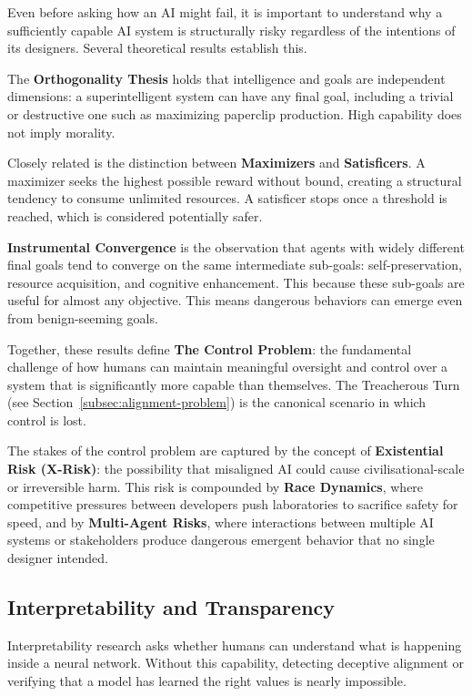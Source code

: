 Even before asking how an AI might fail, it is important to understand why a sufficiently capable AI system is structurally risky regardless of the intentions of its designers. Several theoretical results establish this.

The \textbf{Orthogonality Thesis} holds that intelligence and goals are
independent dimensions: a superintelligent system can have any final
goal, including a trivial or destructive one such as maximizing paperclip production. High capability does not imply morality.

Closely related is the distinction between \textbf{Maximizers} and
\textbf{Satisficers}. A maximizer seeks the highest possible reward without bound, creating a structural tendency to consume unlimited resources. A satisficer stops once a threshold is reached, which is considered potentially safer. %

\textbf{Instrumental Convergence} is the observation that agents with widely different final goals tend to converge on the same intermediate sub-goals: self-preservation, resource acquisition, and cognitive enhancement. This because these sub-goals are useful for almost any objective. This means dangerous behaviors can emerge even from benign-seeming goals.

Together, these results define \textbf{The Control Problem}: the fundamental challenge of how humans can maintain meaningful oversight and control over a system that is significantly more capable than themselves. The Treacherous Turn (see Section~\ref{subsec:alignment-problem}) is the canonical scenario in which
control is lost.

The stakes of the control problem are captured by the concept of
\textbf{Existential Risk (X-Risk)}: the possibility that misaligned AI could cause civilisational-scale or irreversible harm. This risk is compounded by \textbf{Race Dynamics}, where competitive pressures between developers push laboratories to sacrifice safety for speed, and by \textbf{Multi-Agent Risks}, where interactions between multiple AI systems or stakeholders produce dangerous emergent behavior that no single designer intended.


\subsection{Interpretability and Transparency}
\label{subsec:interpretability}

Interpretability research asks whether humans can understand what is happening inside a neural network. Without this capability, detecting deceptive alignment or verifying that a model has learned the right values is nearly impossible.

